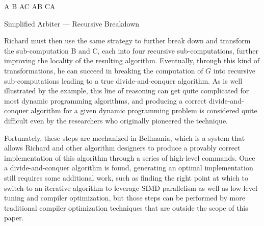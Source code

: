 \begin{algorithm}
\renewcommand\arraystretch{1.3}
\begin{algorithmic}
  \State A 
  \State B    
  \State A
  \State C    
  \State A
  \State B    
  \State C
  \State A
\end{algorithmic}
\caption{\label{intro:recursive-A}
   Simplified Arbiter --- Recursive Breakdown}
\end{algorithm}


Richard must then use the same strategy to further break down and
transform the sub-computation B and C, each into four recursive sub-computations, 
further improving the locality of the resulting algorithm.
Eventually, through this kind of transformations, he can succeed in breaking the computation of $G$ into recursive sub-computations leading to a true divide-and-conquer algorithm. 
As is well illustrated by the example, this line of reasoning can get quite complicated for most dynamic programming algorithms, 
and producing a correct divide-and-conquer algorithm for a given dynamic programming problem is considered quite difficult even by the researchers who originally pioneered the technique. 

Fortunately, these steps are mechanized in Bellmania, which is a system that allows
Richard and other algorithm designers to produce a provably
correct implementation of this algorithm through a series of high-level commands. 
Once a divide-and-conquer algorithm is found, generating an optimal implementation still requires some additional work, such as finding the right point at which to switch to an iterative algorithm to leverage SIMD parallelism as well as low-level tuning and compiler optimization, but those steps can be performed by more traditional compiler optimization techniques that are outside the scope of this paper.

